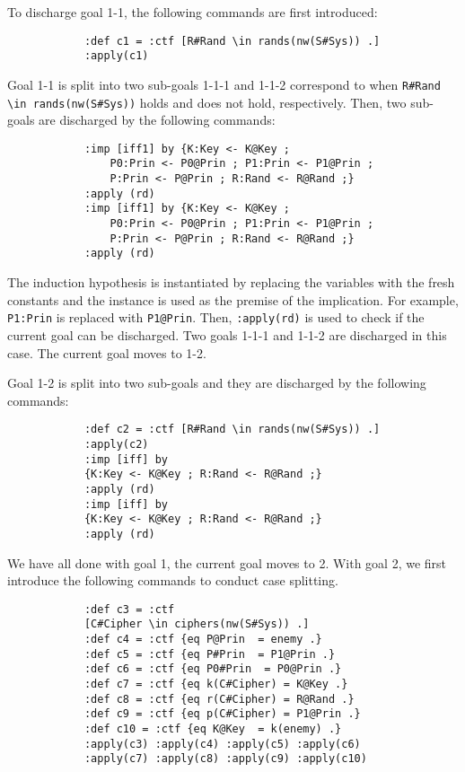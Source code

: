 \documentclass[10pt, conference, compsocconf]{IEEEtran}
\begin{document}
	To discharge goal 1-1, the following commands are first introduced:
	\begin{small}
		\begin{verbatim}
			:def c1 = :ctf [R#Rand \in rands(nw(S#Sys)) .]
			:apply(c1)
		\end{verbatim}
	\end{small}
	
	\noindent %
	Goal 1-1 is split into two sub-goals 1-1-1 and 1-1-2 correspond to when \verb!R#Rand \in rands(nw(S#Sys))! holds and does not hold, respectively. Then, two sub-goals are discharged by the following commands:
	
	\begin{small}
		\begin{verbatim}
			:imp [iff1] by {K:Key <- K@Key ; 
				P0:Prin <- P0@Prin ; P1:Prin <- P1@Prin ; 
				P:Prin <- P@Prin ; R:Rand <- R@Rand ;}
			:apply (rd)
			:imp [iff1] by {K:Key <- K@Key ; 
				P0:Prin <- P0@Prin ; P1:Prin <- P1@Prin ; 
				P:Prin <- P@Prin ; R:Rand <- R@Rand ;}
			:apply (rd)
		\end{verbatim}
	\end{small}
	
	\noindent
	The induction hypothesis is instantiated by replacing the variables
	with the fresh constants and the instance is used as the premise of the
	implication. For example, \verb!P1:Prin! is replaced with \verb!P1@Prin!.
	Then, \verb!:apply(rd)! is used to check if the current
	goal can be discharged. Two goals 1-1-1 and 1-1-2 are discharged in this case.
	The current goal moves to 1-2.
	
	Goal 1-2 is split into two sub-goals and they are discharged by the following commands:
	
	\begin{small}
		\begin{verbatim}
			:def c2 = :ctf [R#Rand \in rands(nw(S#Sys)) .]
			:apply(c2)
			:imp [iff] by 
			{K:Key <- K@Key ; R:Rand <- R@Rand ;}
			:apply (rd)
			:imp [iff] by 
			{K:Key <- K@Key ; R:Rand <- R@Rand ;}
			:apply (rd)
		\end{verbatim}
	\end{small}
	
	\noindent
	We have all done with goal 1, the current goal moves to 2. With goal 2, we first introduce the following commands to conduct case splitting.
	
	\begin{small}
		\begin{verbatim}
			:def c3 = :ctf 
			[C#Cipher \in ciphers(nw(S#Sys)) .]
			:def c4 = :ctf {eq P@Prin  = enemy .}
			:def c5 = :ctf {eq P#Prin  = P1@Prin .}
			:def c6 = :ctf {eq P0#Prin  = P0@Prin .}
			:def c7 = :ctf {eq k(C#Cipher) = K@Key .}
			:def c8 = :ctf {eq r(C#Cipher) = R@Rand .}
			:def c9 = :ctf {eq p(C#Cipher) = P1@Prin .}
			:def c10 = :ctf {eq K@Key  = k(enemy) .}
			:apply(c3) :apply(c4) :apply(c5) :apply(c6) 
			:apply(c7) :apply(c8) :apply(c9) :apply(c10)
		\end{verbatim}
	\end{small}
	
\end{document}
